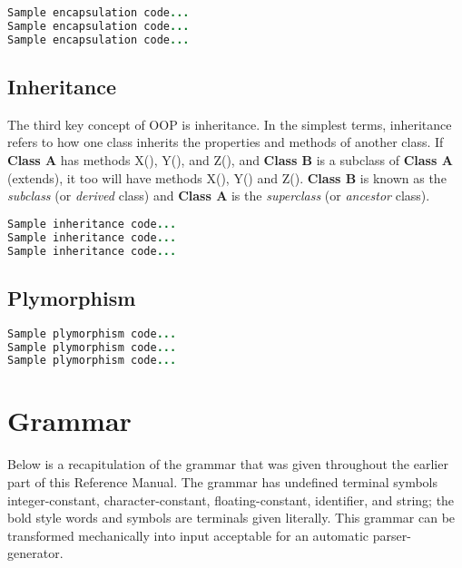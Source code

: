 \documentclass[12pt]{report}
\begin{document}
\begin{lstlisting}[language=Java,label=some-code,caption=FLOOD Encapsulation example]
Sample encapsulation code...
Sample encapsulation code...
Sample encapsulation code...
\end{lstlisting}

\subsection{Inheritance}

\begin{doublespace}
The third key concept of OOP is inheritance. In the simplest terms, inheritance refers to how one class inherits the properties and methods of another class. If \textbf{Class A} has methods X(), Y(), and Z(), and \textbf{Class B} is a subclass of \textbf{Class A} (extends), it too will have methods X(), Y() and Z(). \textbf{Class B} is known as the \textit{subclass} (or \textit{derived} class) and \textbf{Class A} is the \textit{superclass} (or \textit{ancestor} class).
\end{doublespace}

\begin{lstlisting}[language=Java,label=some-code,caption=FLOOD Inheritance example]
Sample inheritance code...
Sample inheritance code...
Sample inheritance code...
\end{lstlisting}

\subsection{Plymorphism}

\begin{doublespace}

\end{doublespace}

\begin{lstlisting}[language=Java,label=some-code,caption=FLOOD Plymorphism example]
Sample plymorphism code...
Sample plymorphism code...
Sample plymorphism code...
\end{lstlisting}

\section{Grammar}

\begin{doublespace}
Below is a recapitulation of the grammar that was given throughout the earlier part of this Reference Manual.  The grammar has undefined terminal symbols integer-constant, character-constant, floating-constant, identifier, and string; the bold style words and symbols are terminals given literally. This grammar can be transformed mechanically into input acceptable for an automatic parser-generator. 
\end{doublespace}
\end{document}
